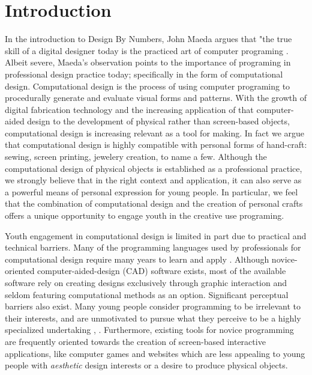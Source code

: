 \documentclass{sigchi}
\begin{document}

\section{Introduction} %
In the introduction to Design By Numbers, John Maeda argues that "the true skill of a digital designer today is the practiced art of computer programing \cite{maeda}. Albeit severe, Maeda's observation points to the importance of programing in professional design practice today; specifically in the form of computational design. Computational design is the process of using computer programing to procedurally generate and evaluate visual forms and patterns. With the growth of digital fabrication technology and the increasing application of that computer-aided design to the development of physical rather than screen-based objects, computational design is increasing relevant as a tool for making. In fact we argue that computational design is highly compatible with personal forms of hand-craft: sewing, screen printing, jewelery creation, to name a few. Although the computational design of physical objects is established as a professional practice, we strongly believe that in the right context and application, it can also serve as a powerful means of personal expression for young people. In particular, we feel that the combination of computational design and the creation of personal crafts offers a unique opportunity to engage youth in the creative use programing.%

Youth engagement in computational design is limited in part due to practical and technical barriers. Many of the programming languages used by professionals for computational design require many years to learn and apply \cite{reas}. Although novice-oriented computer-aided-design (CAD) software exists, most of the available software rely on creating designs exclusively through graphic interaction and seldom featuring computational methods as an option. Significant perceptual barriers also exist. Many young people consider programming to be irrelevant to their interests, and are unmotivated to pursue what they perceive to be a highly specialized undertaking \cite{resnick1}, \cite{introductory_programming}. Furthermore, existing tools for novice programming are frequently oriented towards the creation of screen-based interactive applications, like computer games and websites which are less appealing to young people with \textit{aesthetic} design interests or a desire to produce physical objects.
\end{document}
